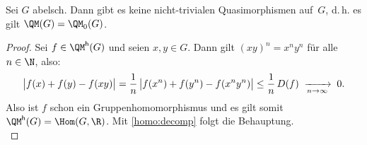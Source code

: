 \begin{thKorollar}
    Sei $G$ abelsch. Dann gibt es keine nicht-trivialen
    Quasimorphismen auf~$G$, d.\,h. es gilt $\QM(G) = \QM_0(G)$.
\end{thKorollar}

\begin{proof}
    Sei $f\in\QM\homo(G)$ und seien $x,y\in G$. Dann gilt
    $(xy)^n = x^ny^n$ für alle $n\in\N$, also:
    \[  \abs[\big]{ f(x) + f(y) - f(xy) }
        = \frac{1}{n} \, \abs[\big]{ f(x^n) + f(y^n) - f(x^ny^n) }
        \leq \frac{1}{n} \, D(f)
        \;\xrightarrow[n\to\infty]{}\; 0
    . \]
    Also ist $f$ schon ein Gruppenhomomorphismus und es gilt somit
    $\QM\homo(G) = \Hom(G,\R)$. Mit \cref{homo:decomp} folgt
    die Behauptung.
    \\
\end{proof}
